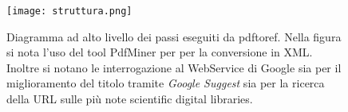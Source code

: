 \begin{figure}[b]
\begin{center}
\texttt{[image: struttura.png]}
\end{center}
\caption[Diagramma ad alto livello dei passi eseguiti dall'applicativo]{Diagramma ad alto livello dei passi eseguiti da pdftoref. Nella figura si nota l'uso del tool PdfMiner per per la conversione in XML. Inoltre si notano le interrogazione al WebService di Google sia per il miglioramento del titolo tramite \textit{Google Suggest} sia per la ricerca della URL sulle più note scientific digital libraries.}
\label{fig:layout}
\end{figure}

